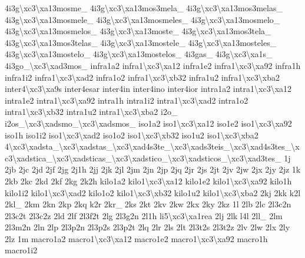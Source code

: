 {4i3g\textbackslash{}xc3\textbackslash{}xa13mosme\-\_\- 4i3g\textbackslash{}xc3\textbackslash{}xa13mos3mela\-\_\- 4i3g\textbackslash{}xc3\textbackslash{}xa13mos3melas\-\_\- 4i3g\textbackslash{}xc3\textbackslash{}xa13mosmele\-\_\- 4i3g\textbackslash{}xc3\textbackslash{}xa13mosmeles\-\_\- 4i3g\textbackslash{}xc3\textbackslash{}xa13mosmelo\-\_\- 4i3g\textbackslash{}xc3\textbackslash{}xa13mosmelos\-\_\- 4i3g\textbackslash{}xc3\textbackslash{}xa13moste\-\_\- 4i3g\textbackslash{}xc3\textbackslash{}xa13mos3tela\-\_\- 4i3g\textbackslash{}xc3\textbackslash{}xa13mos3telas\-\_\- 4i3g\textbackslash{}xc3\textbackslash{}xa13mostele\-\_\- 4i3g\textbackslash{}xc3\textbackslash{}xa13mosteles\-\_\- 4i3g\textbackslash{}xc3\textbackslash{}xa13mostelo\-\_\- 4i3g\textbackslash{}xc3\textbackslash{}xa13mostelos\-\_\- 4i3gas\-\_\- 4i3g\textbackslash{}xc3\textbackslash{}xa1s\-\_\- 4i3go\-\_\textbackslash{}xc3\textbackslash{}xad3mos\-\_\- infra1a2 infra1\textbackslash{}xc3\textbackslash{}xa12 infra1e2 infra1\textbackslash{}xc3\textbackslash{}xa92 infra1h infra1i2 infra1\textbackslash{}xc3\textbackslash{}xad2 infra1o2 infra1\textbackslash{}xc3\textbackslash{}xb32 infra1u2 infra1\textbackslash{}xc3\textbackslash{}xba2 inter4\textbackslash{}xc3\textbackslash{}xa9s inter4esar inter4in inter4ino inter4ior intra1a2 intra1\textbackslash{}xc3\textbackslash{}xa12 intra1e2 intra1\textbackslash{}xc3\textbackslash{}xa92 intra1h intra1i2 intra1\textbackslash{}xc3\textbackslash{}xad2 intra1o2 intra1\textbackslash{}xc3\textbackslash{}xb32 intra1u2 intra1\textbackslash{}xc3\textbackslash{}xba2 i2o\-\_\- i2os\-\_\textbackslash{}xc3\textbackslash{}xadsmo\-\_\textbackslash{}xc3\textbackslash{}xadsmos\-\_\- iso1a2 iso1\textbackslash{}xc3\textbackslash{}xa12 iso1e2 iso1\textbackslash{}xc3\textbackslash{}xa92 iso1h iso1i2 iso1\textbackslash{}xc3\textbackslash{}xad2 iso1o2 iso1\textbackslash{}xc3\textbackslash{}xb32 iso1u2 iso1\textbackslash{}xc3\textbackslash{}xba2 4\textbackslash{}xc3\textbackslash{}xadsta\-\_\textbackslash{}xc3\textbackslash{}xadstas\-\_\textbackslash{}xc3\textbackslash{}xad4s3te\-\_\textbackslash{}xc3\textbackslash{}xads3teis\-\_\textbackslash{}xc3\textbackslash{}xad4s3tes\-\_\textbackslash{}xc3\textbackslash{}xadstica\-\_\textbackslash{}xc3\textbackslash{}xadsticas\-\_\textbackslash{}xc3\textbackslash{}xadstico\-\_\textbackslash{}xc3\textbackslash{}xadsticos\-\_\textbackslash{}xc3\textbackslash{}xad3tes\-\_\- 1j 2jb 2jc 2jd 2jf 2jg 2j1h 2jj 2jk 2jl 2jm 2jn 2jp 2jq 2jr 2js 2jt 2jv 2jw 2jx 2jy 2jz 1k 2kb 2kc 2kd 2kf 2kg 2k2h kilo1a2 kilo1\textbackslash{}xc3\textbackslash{}xa12 kilo1e2 kilo1\textbackslash{}xc3\textbackslash{}xa92 kilo1h kilo1i2 kilo1\textbackslash{}xc3\textbackslash{}xad2 kilo1o2 kilo1\textbackslash{}xc3\textbackslash{}xb32 kilo1u2 kilo1\textbackslash{}xc3\textbackslash{}xba2 2kj 2kk k2l 2kl\-\_\- 2km 2kn 2kp 2kq k2r 2kr\-\_\- 2ks 2kt 2kv 2kw 2kx 2ky 2kz 1l 2lb 2lc 2l3c2n 2l3c2t 2l3c2z 2ld 2lf 2l3f2t 2lg 2l3g2n 2l1h li5\textbackslash{}xc3\textbackslash{}xa1rea 2lj 2lk l4l 2ll\-\_\- 2lm 2l3m2n 2ln 2lp 2l3p2n 2l3p2s 2l3p2t 2lq 2lr 2ls 2lt 2l3t2s 2l3t2z 2lv 2lw 2lx 2ly 2lz 1m macro1a2 macro1\textbackslash{}xc3\textbackslash{}xa12 macro1e2 macro1\textbackslash{}xc3\textbackslash{}xa92 macro1h macro1i2 }
